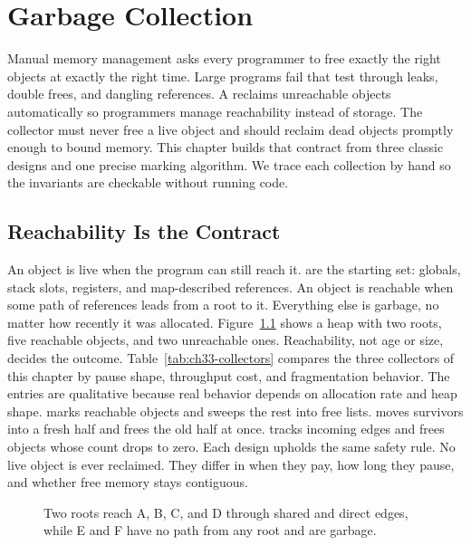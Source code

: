 \chapter{Garbage Collection}\label{ch:garbage-collection}

Manual memory management asks every programmer to free exactly the right objects at exactly the right time.
Large programs fail that test through leaks, double frees, and dangling references.
A  reclaims unreachable objects automatically so programmers manage reachability instead of storage.
The collector must never free a live object and should reclaim dead objects promptly enough to bound memory.
This chapter builds that contract from three classic designs and one precise marking algorithm.
We trace each collection by hand so the invariants are checkable without running code.

\section{Reachability Is the Contract}\label{sec:ch33-reachability}

An object is live when the program can still reach it.
 are the starting set: globals, stack slots, registers, and map-described references.
An object is reachable when some path of references leads from a root to it.
Everything else is garbage, no matter how recently it was allocated.
Figure~\ref{fig:ch33-heap-graph} shows a heap with two roots, five reachable objects, and two unreachable ones.
Reachability, not age or size, decides the outcome.
Table~\ref{tab:ch33-collectors} compares the three collectors of this chapter by pause shape, throughput cost, and fragmentation behavior.
The entries are qualitative because real behavior depends on allocation rate and heap shape.
 marks reachable objects and sweeps the rest into free lists.
 moves survivors into a fresh half and frees the old half at once.
 tracks incoming edges and frees objects whose count drops to zero.
Each design upholds the same safety rule.
No live object is ever reclaimed.
They differ in when they pay, how long they pause, and whether free memory stays contiguous.

\begin{figure}[htbp]
\centering
{}
\caption{Two roots reach A, B, C, and D through shared and direct edges, while E and F have no path from any root and are garbage.}
\label{fig:ch33-heap-graph}
\end{figure}

